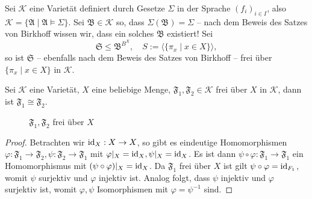 \begin{example}
    Sei $\mathcal{K}$ eine Varietät definiert durch Gesetze $\Sigma$ in der Sprache $(f_i)_{i\in I}$, also $\mathcal{K} = \{ \mathfrak{A} \mid \mathfrak{A} \models \Sigma \}$. Sei $\mathfrak{B} \in \mathcal{K}$ so, dass $\Sigma(\mathfrak{B}) = \Sigma$ -- nach dem Beweis des Satzes von Birkhoff wissen wir, dass ein solches $\mathfrak{B}$ existiert! Sei
    $$ \mathfrak{S} \leq \mathfrak{B}^{B^X}, \quad S := \langle \{ \pi_x \mid x \in X \} \rangle, $$
    so ist $\mathfrak{S}$ -- ebenfalls nach dem Beweis des Satzes von Birkhoff -- frei über $\{ \pi_x \mid x \in X \}$ in $\mathcal{K}$.
\end{example}

\begin{proposition}
    Sei $\mathcal{K}$ eine Varietät, $X$ eine beliebige Menge, $\mathfrak{F}_1, \mathfrak{F}_2 \in \mathcal{K}$ frei über $X$ in $\mathcal{K}$, dann ist $\mathfrak{F}_1 \cong \mathfrak{F}_2$.
\end{proposition}

\begin{figure}[H]
    \centering
    \caption{$\mathfrak{F}_1, \mathfrak{F}_2$ frei über $X$}
\end{figure}

\begin{proof}
    Betrachten wir $\operatorname{id}_X : X \to X$, so gibt es eindeutige Homomorphismen $\varphi : \mathfrak{F}_1 \to \mathfrak{F}_2, \psi : \mathfrak{F}_2 \to \mathfrak{F}_1$ mit $\varphi \vert_X = \operatorname{id}_X, \psi \vert_X = \operatorname{id}_X$. Es ist dann $\psi \circ \varphi : \mathfrak{F}_1 \to \mathfrak{F}_1$ ein Homomorphismus mit $(\psi \circ \varphi) \vert_X = \operatorname{id}_X$. Da $\mathfrak{F}_1$ frei über $X$ ist gilt $\psi \circ \varphi = \operatorname{id}_{F_1}$, womit $\psi$ surjektiv und $\varphi$ injektiv ist. Analog folgt, dass $\psi$ injektiv und $\varphi$ surjektiv ist, womit $\varphi, \psi$ Isomorphismen mit $\varphi = \psi^{-1}$ sind.
\end{proof}

